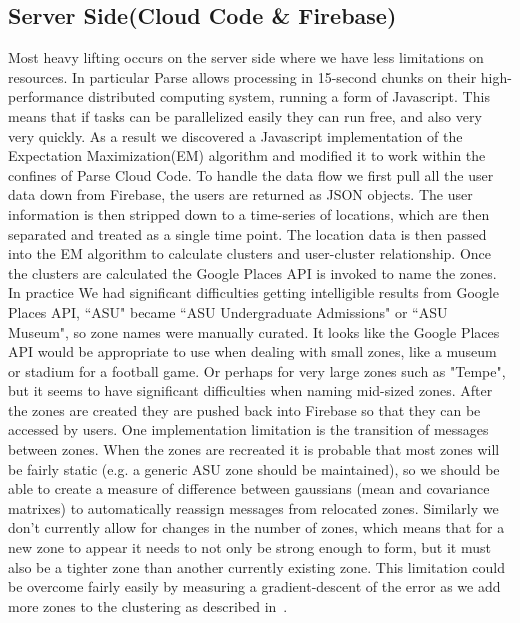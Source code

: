 \subsection{Server Side(Cloud Code \& Firebase)}
Most heavy lifting occurs on the server side where we have less limitations on resources.  In particular Parse allows processing in 15-second chunks on their high-performance distributed computing system, running a form of Javascript.  This means that if tasks can be parallelized easily they can run free, and also very very quickly.  As a result we discovered a Javascript implementation of the Expectation Maximization(EM) algorithm and modified it to work within the confines of Parse Cloud Code.  To handle the data flow we first pull all the user data down from Firebase, the users are returned as JSON objects. The user information is then stripped down to a time-series of locations, which are then separated and treated as a single time point. The location data is then passed into the EM algorithm to calculate clusters and user-cluster relationship.  Once the clusters are calculated the Google Places API is invoked to name the zones.  In practice We had significant difficulties getting intelligible results from Google Places API, ``ASU" became ``ASU Undergraduate Admissions" or ``ASU Museum", so zone names were manually curated.   It looks like the Google Places API would be appropriate to use when dealing with small zones, like a museum or stadium for a football game.  Or perhaps for very large zones such as "Tempe", but it seems to have significant difficulties when naming mid-sized zones.  After the zones are created they are pushed back into Firebase so that they can be accessed by users.  One implementation limitation is the transition of messages between zones.  When the zones are recreated it is probable that most zones will be fairly static (e.g. a generic ASU zone should be maintained),  so we should be able to create a measure of difference between gaussians (mean and covariance matrixes) to automatically reassign messages from relocated zones.  Similarly we don't currently allow for changes in the number of zones, which means that for a new zone to appear it needs to not only be strong enough to form, but it must also be a tighter zone than another currently existing zone.  This limitation could be overcome fairly easily by measuring a gradient-descent of the error as we add more zones to the clustering as described in~\cite{ray1999determination}.







 
